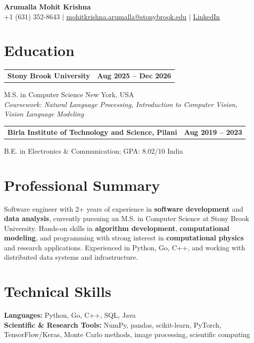 \documentclass[letterpaper,10pt]{article}
\makeatletter
\newcommand{\entry}[2]{%
  \noindent
  \begin{tabularx}{\linewidth}
    {@{}>{\raggedright\arraybackslash}X@{\hspace{6pt}}r@{}}
    \textbf{#1} & #2
  \end{tabularx}\par
}
\makeatother
\begin{document}
\begin{center}
    {\LARGE\bfseries Arumalla Mohit Krishna}\\[3pt]
    +1 (631) 352-8643 $|$
    \href{mailto:mohitkrishna.arumalla@stonybrook.edu}
    {mohitkrishna.arumalla@stonybrook.edu} $|$
    \href{https://linkedin.com/in/mohit-krishna-arumalla}
    {LinkedIn}
\end{center}
\vspace{-8pt}

\section{Education}

\entry
  {\textbf{Stony Brook University}}
  {\textbf{Aug 2025 -- Dec 2026}}

M.S. in Computer Science \hfill New York, USA\\
\textit{
Coursework: Natural Language Processing,
Introduction to Computer Vision, Vision Language Modeling
}
\vspace{3pt}

\entry
  {\textbf{Birla Institute of Technology and Science, Pilani}}
  {\textbf{Aug 2019 -- 2023}}

B.E. in Electronics \& Communication; GPA: 8.02/10 \hfill India
\section{Professional Summary}

Software engineer with 2+ years of experience in \textbf{software development} and \textbf{data analysis}, currently pursuing an M.S. in Computer Science at Stony Brook University. Hands-on skills in \textbf{algorithm development}, \textbf{computational modeling}, and programming with strong interest in \textbf{computational physics} and research applications. Experienced in Python, Go, C++, and working with distributed data systems and infrastructure.

\section{Technical Skills}

\textbf{Languages:}
Python, Go, C++, SQL, Java\\

\textbf{Scientific \& Research Tools:}
NumPy, pandas, scikit-learn, PyTorch, TensorFlow/Keras, Monte Carlo methods, image processing, scientific computing\\
\end{document}
